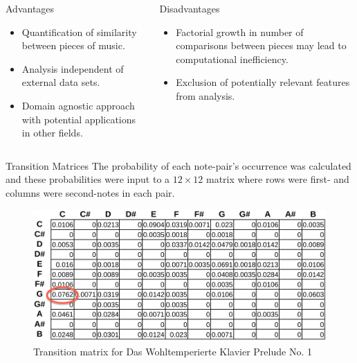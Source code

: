 \documentclass[final]{beamer}
\newlength{\onecolwid}
\newlength{\halfcolwid}
\newlength{\halfcolwidtwo}
\begin{document}
\begin{frame}[t]
\begin{columns}[t]
\begin{column}{\onecolwid}
\begin{columns}[t]

\begin{column}{\halfcolwid}
\begin{block}{Advantages}
\begin{itemize}
\item Quantification of similarity between pieces of music.
\item Analysis independent of external data sets.
\item Domain agnostic approach with potential applications in other fields.
\end{itemize}
\end{block}
\end{column}

\begin{column}{\halfcolwid}
\begin{block}{Disadvantages}
\begin{itemize}
\item Factorial growth in number of comparisons between pieces may lead to computational inefficiency.
\item Exclusion of potentially relevant features from analysis. 
\end{itemize}
\end{block}
\end{column}
\end{columns}

\begin{column}{\onecolwid}
\begin{block}{Transition Matrices}
The probability of each note-pair's occurrence was calculated and these probabilities were input to a $12\times12$ matrix where rows were first- and columns were second-notes in each pair. 
\begin{figure}
\includegraphics[width=\halfcolwidtwo]{Visuals/WTK1transitionmat.pdf}
\caption{Transition matrix for Das Wohltemperierte Klavier Prelude No. 1}
\end{figure}
\end{block}
\end{column}


\end{column}
\end{columns}
\end{frame}
\end{document}
